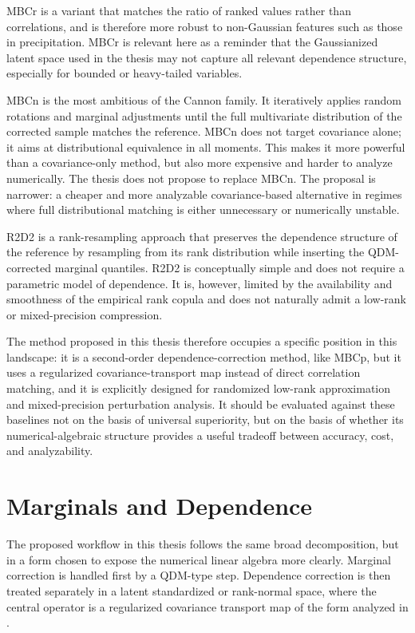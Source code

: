 MBCr \cite{cannon2016mbc} is a variant that matches the ratio of ranked values
rather than correlations, and is therefore more robust to non-Gaussian features
such as those in precipitation. MBCr is relevant here as a reminder that the
Gaussianized latent space used in the thesis may not capture all relevant
dependence structure, especially for bounded or heavy-tailed variables.

MBCn \cite{cannon2018mbcn} is the most ambitious of the Cannon family. It
iteratively applies random rotations and marginal adjustments until the full
multivariate distribution of the corrected sample matches the reference. MBCn
does not target covariance alone; it aims at distributional equivalence in all
moments. This makes it more powerful than a covariance-only method, but also more
expensive and harder to analyze numerically. The thesis does not propose to
replace MBCn. The proposal is narrower: a cheaper and more analyzable
covariance-based alternative in regimes where full distributional matching is
either unnecessary or numerically unstable.

R2D2 \cite{vrac2018r2d2} is a rank-resampling approach that preserves the
dependence structure of the reference by resampling from its rank distribution
while inserting the QDM-corrected marginal quantiles. R2D2 is conceptually
simple and does not require a parametric model of dependence. It is, however,
limited by the availability and smoothness of the empirical rank copula and does
not naturally admit a low-rank or mixed-precision compression.

The method proposed in this thesis therefore occupies a specific position in this
landscape: it is a second-order dependence-correction method, like MBCp, but it
uses a regularized covariance-transport map instead of direct correlation
matching, and it is explicitly designed for randomized low-rank approximation and
mixed-precision perturbation analysis. It should be evaluated against these
baselines not on the basis of universal superiority, but on the basis of whether
its numerical-algebraic structure provides a useful tradeoff between accuracy,
cost, and analyzability.

\section{Marginals and Dependence}

The proposed workflow in this thesis follows the same broad decomposition, but in
a form chosen to expose the numerical linear algebra more clearly. Marginal
correction is handled first by a QDM-type step. Dependence correction is then
treated separately in a latent standardized or rank-normal space, where the central
operator is a regularized covariance transport map of the form analyzed in
.

